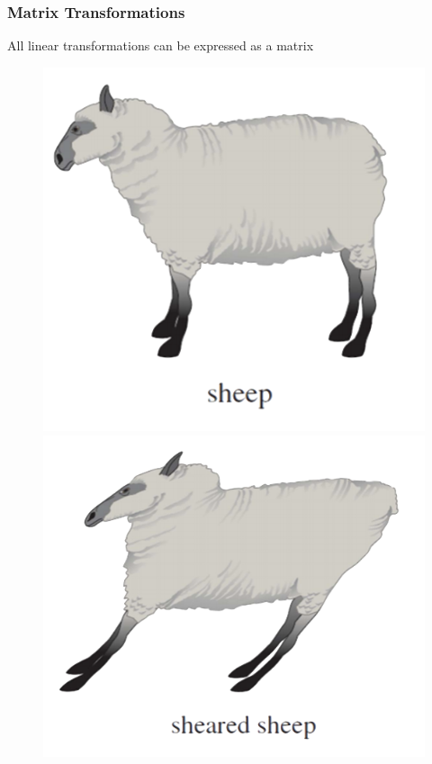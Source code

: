 \documentclass{beamer}
\begin{document}
\begin{frame}[t]\vspace{10pt}
\frametitle{Matrix Transformations}
All linear transformations can be expressed as a matrix

\begin{figure}[!tbp]
  \centering
  \begin{minipage}[b]{0.45\textwidth}
    \includegraphics[width=\textwidth]{./images/sheep.png}
  \end{minipage}
  \hfill
  \begin{minipage}[b]{0.45\textwidth}
    \includegraphics[width=\textwidth]{./images/sheep_shear.png}
  \end{minipage}
\end{figure}
\end{frame}
\end{document}
